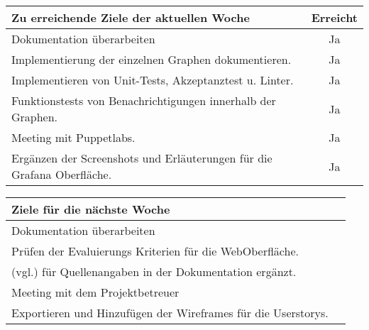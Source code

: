 \begin{tabularx}{\textwidth}{Xc}
    \arrayrulecolor{OliveGreen}
    \toprule
    {\bfseries Zu erreichende Ziele der aktuellen Woche} & {\bfseries Erreicht} \\
    \midrule[2pt]
    Dokumentation überarbeiten                              &Ja              \\
    \rowcolor{OliveGreen!15}
    Implementierung der einzelnen Graphen dokumentieren.     &Ja              \\
    \rowcolor{White}
    Implementieren von Unit-Tests, Akzeptanztest u. Linter.  &Ja              \\
    \rowcolor{OliveGreen!15}
    Funktionstests von Benachrichtigungen innerhalb der Graphen.  &Ja         \\
    \rowcolor{White}
    Meeting mit Puppetlabs.                                  &Ja              \\
    \rowcolor{OliveGreen!15}
    Ergänzen der Screenshots und Erläuterungen für die Grafana Oberfläche. &Ja \\
   \bottomrule[2pt]
\end{tabularx}
%
\vspace{1cm}
%
\begin{tabularx}{\textwidth}{Xc}
    \arrayrulecolor{OliveGreen}
    \toprule
    {\bfseries Ziele für die nächste Woche}        &                         \\
    \midrule[2pt]
    Dokumentation überarbeiten                     &                         \\
    \rowcolor{OliveGreen!15}
    Prüfen der Evaluierungs Kriterien für die WebOberfläche.  &               \\
    \rowcolor{White}
    (vgl.) für Quellenangaben in der Dokumentation ergänzt.    &              \\
    \rowcolor{OliveGreen!15}
    Meeting mit dem Projektbetreuer      &                     \\
    \rowcolor{White}
    Exportieren und Hinzufügen der Wireframes für die Userstorys.  &          \\
\end{tabularx}
